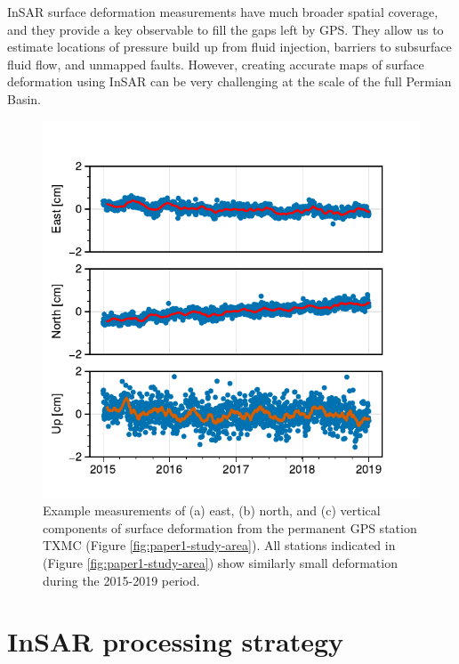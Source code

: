 InSAR surface deformation measurements have much broader spatial coverage, and they provide a key observable to fill the gaps left by GPS. They allow us to estimate locations of pressure build up from fluid injection, barriers to subsurface fluid flow, and unmapped faults. However, creating accurate maps of surface deformation using InSAR can be very challenging at the scale of the full Permian Basin.


\begin{figure}
	\centering
	\includegraphics[width=0.9\linewidth]{figures/chapter3-permian/gps-txmc.pdf}
	\caption[Example permanent GPS station measurements]{
		Example measurements of (a) east, (b) north, and (c) vertical components of surface deformation from the permanent GPS station TXMC (Figure \ref{fig:paper1-study-area}). All stations indicated in (Figure \ref{fig:paper1-study-area}) show similarly small deformation during the 2015-2019 period.
	}
	\label{fig:ch3-gps}
\end{figure}


\section{InSAR processing strategy}
\label{sec:ch2-insar-processing}

